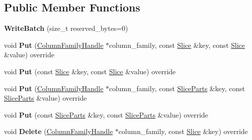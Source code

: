 \subsection*{Public Member Functions}
\begin{DoxyCompactItemize}
\item 
{\bfseries Write\+Batch} (size\+\_\+t reserved\+\_\+bytes=0)\hypertarget{classrocksdb_1_1WriteBatch_aa964288cfc13a19a8c3368c7dd4e6c7e}{}\label{classrocksdb_1_1WriteBatch_aa964288cfc13a19a8c3368c7dd4e6c7e}

\item 
void {\bfseries Put} (\hyperlink{classrocksdb_1_1ColumnFamilyHandle}{Column\+Family\+Handle} $\ast$column\+\_\+family, const \hyperlink{classrocksdb_1_1Slice}{Slice} \&key, const \hyperlink{classrocksdb_1_1Slice}{Slice} \&value) override\hypertarget{classrocksdb_1_1WriteBatch_ae240788d70139efd5322c47d5a57204e}{}\label{classrocksdb_1_1WriteBatch_ae240788d70139efd5322c47d5a57204e}

\item 
void {\bfseries Put} (const \hyperlink{classrocksdb_1_1Slice}{Slice} \&key, const \hyperlink{classrocksdb_1_1Slice}{Slice} \&value) override\hypertarget{classrocksdb_1_1WriteBatch_a2031d860578ed8bd8d82c7460009cb4b}{}\label{classrocksdb_1_1WriteBatch_a2031d860578ed8bd8d82c7460009cb4b}

\item 
void {\bfseries Put} (\hyperlink{classrocksdb_1_1ColumnFamilyHandle}{Column\+Family\+Handle} $\ast$column\+\_\+family, const \hyperlink{structrocksdb_1_1SliceParts}{Slice\+Parts} \&key, const \hyperlink{structrocksdb_1_1SliceParts}{Slice\+Parts} \&value) override\hypertarget{classrocksdb_1_1WriteBatch_a07519b3d03c199febe81b8a243af1ed0}{}\label{classrocksdb_1_1WriteBatch_a07519b3d03c199febe81b8a243af1ed0}

\item 
void {\bfseries Put} (const \hyperlink{structrocksdb_1_1SliceParts}{Slice\+Parts} \&key, const \hyperlink{structrocksdb_1_1SliceParts}{Slice\+Parts} \&value) override\hypertarget{classrocksdb_1_1WriteBatch_a56f2b04b7cb9a06634f09525fed4d4a6}{}\label{classrocksdb_1_1WriteBatch_a56f2b04b7cb9a06634f09525fed4d4a6}

\item 
void {\bfseries Delete} (\hyperlink{classrocksdb_1_1ColumnFamilyHandle}{Column\+Family\+Handle} $\ast$column\+\_\+family, const \hyperlink{classrocksdb_1_1Slice}{Slice} \&key) override\hypertarget{classrocksdb_1_1WriteBatch_a027bdf26d0a75d8e95820fc9d0213e0f}{}\label{classrocksdb_1_1WriteBatch_a027bdf26d0a75d8e95820fc9d0213e0f}


\end{DoxyCompactItemize}
